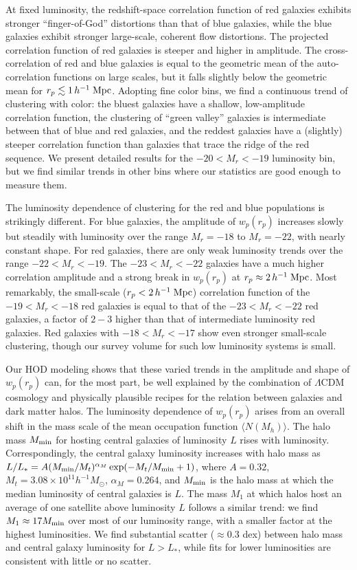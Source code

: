 \documentclass[]{emulateapj}
\newcommand{\hmpc}{\,h^{-1}\;{\rm Mpc}}
\newcommand{\wrp}{{w_p(r_p)}}
\def\Mmin{M_{\rm min}}
\def\hMsun{h^{-1}M_\odot}
\begin{document}
At fixed luminosity, the redshift-space correlation function of
red galaxies exhibits stronger ``finger-of-God'' distortions
than that of blue galaxies, while the blue galaxies exhibit
stronger large-scale, coherent flow distortions.
The projected correlation function of red galaxies is steeper and 
higher in amplitude.  The cross-correlation of red and blue galaxies
is equal to the geometric mean of the auto-correlation functions
on large scales, but it falls slightly below the geometric mean
for $r_p \la 1\hmpc$.  Adopting fine color bins, we find a continuous
trend of clustering with color: the bluest galaxies have a shallow, 
low-amplitude correlation function, the clustering of ``green valley''
galaxies is intermediate between that of blue and red galaxies,
and the reddest galaxies have a (slightly) steeper correlation
function than galaxies that trace the ridge of the red sequence.
We present detailed results for the $-20<M_r<-19$ luminosity bin,
but we find similar trends in other bins where our statistics
are good enough to measure them.

The luminosity dependence of clustering for the red and blue populations
is strikingly different.  For blue galaxies, the amplitude of $\wrp$
increases slowly but steadily with luminosity over the range
$M_r=-18$ to $M_r=-22$, with nearly constant shape.
For red galaxies, there are only weak luminosity trends over 
the range $-22<M_r<-19$.  The $-23<M_r<-22$ galaxies have a
much higher correlation amplitude and a strong break in $\wrp$
at $r_p\approx 2\hmpc$.  Most remarkably, the small-scale
($r_p < 2\hmpc$) correlation function of the $-19<M_r<-18$
red galaxies is equal to that of the $-23<M_r<-22$ red galaxies,
a factor of $2-3$ higher than that of intermediate luminosity
red galaxies.  Red galaxies with $-18<M_r<-17$ show even stronger
small-scale clustering, though our survey volume for such low
luminosity systems is small.

Our HOD modeling shows that these varied trends in the amplitude
and shape of $\wrp$ can, for the most part, be well explained
by the combination of $\Lambda$CDM cosmology and physically
plausible recipes for the relation between galaxies and dark matter
halos.  The luminosity dependence of $\wrp$ arises from an overall
shift in the mass scale of the mean occupation function
$\langle N(M_h)\rangle$.  The halo mass $\Mmin$ for hosting central
galaxies of luminosity $L$ rises with luminosity. Correspondingly, the 
central galaxy luminosity increases with halo mass as
$L/L_*=A(\Mmin/M_t)^{\alpha_M}\exp(-M_t/\Mmin+1)$, where $A=0.32$, 
$M_t=3.08\times 10^{11}\hMsun$, $\alpha_M=0.264$, and
$M_{\rm min}$ is the
halo mass at which the median luminosity of central galaxies is $L$.
The mass $M_1$ at which halos host an average of one satellite
above luminosity $L$ follows a similar trend: we find 
$M_1\approx 17 M_{\rm min}$ over most of our luminosity range,
with a smaller factor at the highest luminosities.
We find substantial scatter ($\approx 0.3$ dex) between halo
mass and central galaxy luminosity for $L>L_*$, while fits for
lower luminosities are consistent with little or no scatter.
\end{document}
